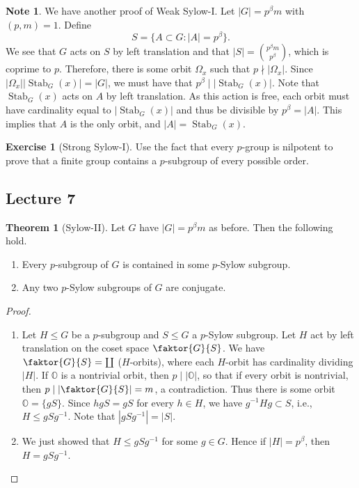 \documentclass[10pt,letterpaper,cm]{nupset}
\theoremstyle{definition}
\newtheorem{note}[definition]{Note}
\theoremstyle{theorem}
\newtheorem{theorem}[definition]{Theorem}
\newtheorem{exercise}[definition]{Exercise}
\theoremstyle{remark}
\newcommand{\1}{\mathbf{1}}
\newcommand{\0}{\vec 0}
\DeclareMathOperator{\stab}{Stab}
\begin{document}
\begin{note}
We have another proof of Weak Sylow-I. Let $|G| = p^{\beta}m$ with $(p, m) =1$. Define $$ S = \{A\subset G : |A| = p^{\beta}\}.$$ We see that $G$ acts on $S$ by left translation and that $|S| = {p^{\beta}m \choose p^{\beta}}$, which is coprime to $p$. Therefore, there is some orbit $\Omega_x$ such that $p \nmid  |\Omega_x|$. Since $|\Omega_x||\stab_G(x)| = |G|$, we must have that $p^{\beta} \mid |\stab_G(x)|$. Note that $\stab_G(x)$ acts on $A$ by left translation. As this action is free, each orbit must have cardinality equal to $|\stab_G(x)|$ and thus be divisible by $p^{\beta} =|A|$. This implies that $A$ is the only orbit, and $|A| = \stab_G(x)$.
\end{note}

\begin{exercise}[Strong Sylow-I]
Use the fact that every $p$-group is nilpotent to prove that a finite group contains a $p$-subgroup of every possible order.
\end{exercise}

\subsection{Lecture 7}

\begin{theorem}[Sylow-II] Let $G$ have $|G|= p^{\beta}m$ as before. Then the following hold.
\begin{enumerate}
\item Every $p$-subgroup of $G$ is contained in some $p$-Sylow subgroup.
\item Any two $p$-Sylow subgroups of $G$ are conjugate.
\end{enumerate}
\end{theorem}

\begin{proof} $ $
\begin{enumerate}
\item Let $H\leq G$ be a $p$-subgroup and $S\leq G$ a $p$-Sylow subgroup.  Let $H$ act by left translation on the coset space $\faktor{G}{S}$. We have $\faktor{G}{S} = \coprod$ ($H$-orbits), where each $H$-orbit has cardinality dividing $|H|$. If $\mathds{O}$ is a nontrivial orbit, then $p\mid |\mathds{O}|$, so that if every orbit is nontrivial, then $p\mid |\faktor{G}{S}| =m$, a contradiction. Thus there is some orbit $\mathds{O} = \{gS\}$. Since $hgS = gS$ for every $h\in H$, we have $g^{-1}Hg\subset S$, i.e., $H\leq gSg^{-1}$. Note that $|gSg^{-1}|=|S|$.
\item We just showed that $H\leq gSg^{-1}$ for some $g\in G$. Hence if $|H| = p^{\beta}$, then $H=gSg^{-1}$.
\end{enumerate}
\end{proof}
\end{document}
